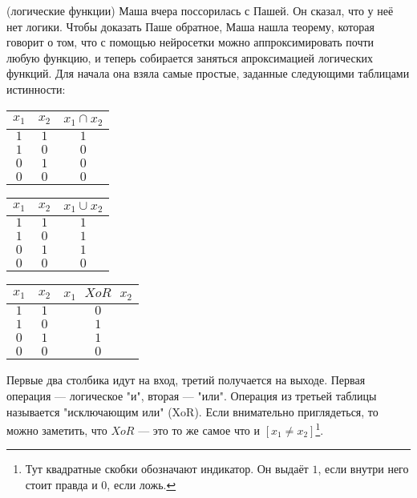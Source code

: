 \begin{problem}{(логические функции)}
Маша вчера поссорилась с Пашей. Он сказал, что у неё нет логики. Чтобы доказать Паше обратное, Маша нашла теорему, которая говорит о том, что с помощью нейросетки можно аппроксимировать почти любую функцию, и теперь собирается заняться апроксимацией логических функций. Для начала она взяла самые простые, заданные следующими таблицами истинности:

\begin{center}
\begin{minipage}{0.3\linewidth} 
\begin{tabular}{c|c|c}
	$x_1$ & $x_2$ & $x_1 \cap x_2$ \\
	\hline 
	$1$ & $1$ & $1$ \\
	\hline 
	$1$ & $0$ & $0$ \\
	\hline 
	$0$ & $1$ & $0$ \\
	\hline 
	$0$ & $0$ & $0$ \\
\end{tabular}
\end{minipage}
\hfill
\begin{minipage}{0.3\linewidth}
		\begin{tabular}{c|c|c}
		$x_1$ & $x_2$ & $x_1 \cup x_2$ \\
		\hline 
		$1$ & $1$ & $1$ \\
		\hline 
		$1$ & $0$ & $1$ \\
		\hline 
		$0$ & $1$ & $1$ \\
		\hline 
		$0$ & $0$ & $0$ \\
	\end{tabular}
\end{minipage}
\hfill
\begin{minipage}{0.3\linewidth}
		\begin{tabular}{c|c|c}
		$x_1$ & $x_2$ & $x_1 \mbox{ } XoR \mbox{ } x_2$ \\
		\hline 
		$1$ & $1$ & $0$ \\
		\hline 
		$1$ & $0$ & $1$ \\
		\hline 
		$0$ & $1$ & $1$ \\
		\hline 
		$0$ & $0$ & $0$ \\
	\end{tabular}
\end{minipage}
\end{center}

Первые два столбика идут на вход, третий получается на выходе. Первая операция --- логическое "и", вторая --- "или".   Операция из третьей таблицы называется "исключающим или" (XoR). Если внимательно приглядеться, то можно заметить, что $XoR$ --- это то же самое что и $[x_1 \ne x_2]$\footnote{Тут квадратные скобки обозначают индикатор. Он выдаёт $1$, если внутри него стоит правда и $0$, если ложь.}. 
\end{problem}

